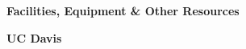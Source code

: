 
\setcounter{page}{1}
\renewcommand{\thepage}{Facilities, Equipment, and Other Resources - Page \arabic{page} of 1}

\begin{center}
\textbf{\large Facilities, Equipment \& Other Resources}
\end{center}


% 
% 









\textbf{UC Davis}

